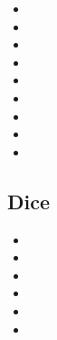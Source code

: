 \begin{multicols}{2}
\begin{itemize}
	\item \glyphdemo{\controllerR}
	\item \glyphdemo{\controllerRalt}
	\item \glyphdemo{\controllerZ}
	\item \glyphdemo{\controllerMouse}
	\item \glyphdemo{\controllerMouseLMB}
	\item \glyphdemo{\controllerMouseRMB}
	\item \glyphdemo{\controllerMouseScroll}
	\item \glyphdemo{\controllerMouseScrollUp}
	\item \glyphdemo{\controllerMouseScrollDown}
\end{itemize}
\end{multicols}

\subsection{Dice}

\begin{multicols}{2}
\begin{itemize}
	\item \glyphdemo{\diceOne}
	\item \glyphdemo{\diceTwo}
	\item \glyphdemo{\diceThree}
	\item \glyphdemo{\diceFour}
	\item \glyphdemo{\diceFive}
	\item \glyphdemo{\diceSix}
\end{itemize}
\end{multicols}

\newpage

